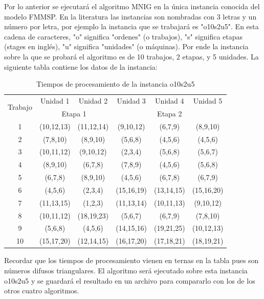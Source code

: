 \documentclass{article}
\begin{document}
\vspace{\baselineskip}
Por lo anterior se ejecutará el algoritmo MNIG en la única instancia conocida
del modelo FMMSP. En la literatura las instancias son nombradas con 3 letras y
un número por letra, por ejemplo la instancia que se trabajará es "o10s2u5". En
esta cadena de caracteres, "o" significa "ordenes" (o trabajos), "s" significa
etapas (stages en inglés), "u" significa "unidades" (o máquinas). Por ende la
instancia sobre la que se probará el algoritmo es de 10 trabajos, 2 etapas, y 
5 unidades. La siguiente tabla contiene los datos de la instancia: 
\autocite{modFMMSP}

\begin{table}[h]
    \caption{Tiempos de procesamiento de la instancia o10s2u5}
    \label{tab:tProc}
    \begin{center}
    \begin{tabular}{c|c|c|c|c|c}
        \hline
        \multirow{2}{*}{Trabajo} & Unidad 1 & Unidad 2 & Unidad 3 & Unidad 4 & Unidad 5\\
        \cline{2-6}
        & \multicolumn{2}{c|}{Etapa 1} & \multicolumn{3}{c}{Etapa 2}\\
        \hline
        1 & (10,12,13) & (11,12,14) & (9,10,12) & (6,7,9) & (8,9,10)\\
        2 & (7,8,10) & (8,9,10) & (5,6,8) & (4,5,6) & (4,5,6) \\
        3 & (10,11,12) & (9,10,12) & (2,3,4) & (5,6,8) & (5,6,7) \\
        4 & (8,9,10) & (6,7,8) & (7,8,9) & (4,5,6) & (5,6,8) \\
        5 & (6,7,8) & (8,9,10) & (4,5,6) & (6,7,8) & (6,7,9) \\
        6 & (4,5,6) & (2,3,4) & (15,16,19) & (13,14,15) & (15,16,20) \\
        7 & (11,13,15) & (1,2,3) & (11,13,14) & (10,11,13) & (9,10,12) \\
        8 & (10,11,12) & (18,19,23) & (5,6,7) & (6,7,9) & (7,8,10) \\
        9 & (5,6,8) & (4,5,6) & (14,15,16) & (19,21,25) & (10,12,13) \\
        10 & (15,17,20) & (12,14,15) & (16,17,20) & (17,18,21) & (18,19,21) \\
        \hline
    \end{tabular}
    \end{center}
\end{table}

Recordar que los tiempos de procesamiento vienen en ternas en la tabla pues son
números difusos triangulares.
El algoritmo será ejecutado sobre esta instancia o10s2u5 y se guardará el
resultado en un archivo para compararlo con los de los otros cuatro algoritmos.
\end{document}
